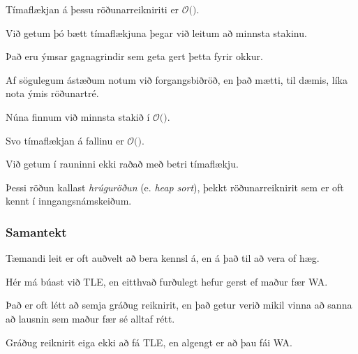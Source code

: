 {
}

{
	{
		\item<1-> Tímaflækjan á þessu röðunarreikniriti er $\mathcal{O}($\onslide<2->{$n^2$}$)$.
		\item<3-> Við getum þó bætt tímaflækjuna þegar við leitum að minnsta stakinu.
		\item<4-> Það eru ýmsar gagnagrindir sem geta gert þetta fyrir okkur.
		\item<5-> Af sögulegum ástæðum notum við forgangsbiðröð, en það mætti, til dæmis, líka nota ýmis röðunartré.
	}
}

{
}

{
	{
		\item<1-> Núna finnum við minnsta stakið í $\mathcal{O}($\onslide<2->{$\log n$}$)$.
		\item<3-> Svo tímaflækjan á fallinu er $\mathcal{O}($\onslide<4->{$n \log n$}$)$.
		\item<5-> Við getum í rauninni ekki raðað með betri tímaflækju.
		\item<6-> Þessi röðun kallast \emph{hrúguröðun} (e. \emph{heap sort}), þekkt röðunarreiknirit sem er oft kennt í inngangsnámskeiðum.
	}
}

{
	\frametitle{Samantekt}
	{
		\item<1-> Tæmandi leit er oft auðvelt að bera kennsl á, en á það til að vera of hæg. 
		\item<2-> Hér má búast við TLE, en eitthvað furðulegt hefur gerst ef maður fær WA.
		\item<3-> Það er oft létt að semja gráðug reiknirit, en það getur verið mikil vinna að sanna að lausnin sem maður fær sé alltaf rétt.
		\item<4-> Gráðug reiknirit eiga ekki að fá TLE, en algengt er að þau fái WA.
	}
}

{
}


